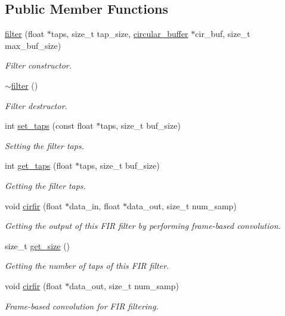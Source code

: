\subsection*{Public Member Functions}
\begin{DoxyCompactItemize}
\item 
\hyperlink{classfilter_a257d61c89ec8558363f6015fdb9016d7}{filter} (float $\ast$taps, size\+\_\+t tap\+\_\+size, \hyperlink{classcircular__buffer}{circular\+\_\+buffer} $\ast$cir\+\_\+buf, size\+\_\+t max\+\_\+buf\+\_\+size)
\begin{DoxyCompactList}\small\item\em Filter constructor. \end{DoxyCompactList}\item 
\mbox{\label{classfilter_a73337fb0e69db82e7c5025e0297ebac5}} 
\hyperlink{classfilter_a73337fb0e69db82e7c5025e0297ebac5}{$\sim$filter} ()
\begin{DoxyCompactList}\small\item\em Filter destructor. \end{DoxyCompactList}\item 
int \hyperlink{classfilter_a2110dd72f12765f0da1c8e3cb4043a67}{set\+\_\+taps} (const float $\ast$taps, size\+\_\+t buf\+\_\+size)
\begin{DoxyCompactList}\small\item\em Setting the filter taps. \end{DoxyCompactList}\item 
int \hyperlink{classfilter_a9ed7fc2a499abfa2aaffc5477e00fb54}{get\+\_\+taps} (float $\ast$taps, size\+\_\+t buf\+\_\+size)
\begin{DoxyCompactList}\small\item\em Getting the filter taps. \end{DoxyCompactList}\item 
void \hyperlink{classfilter_a983d5bb1cda993859f2a31926d2a5988}{cirfir} (float $\ast$data\+\_\+in, float $\ast$data\+\_\+out, size\+\_\+t num\+\_\+samp)
\begin{DoxyCompactList}\small\item\em Getting the output of this F\+IR filter by performing frame-\/based convolution. \end{DoxyCompactList}\item 
size\+\_\+t \hyperlink{classfilter_a1fe57acd364208770931817c847b725a}{get\+\_\+size} ()
\begin{DoxyCompactList}\small\item\em Getting the number of taps of this F\+IR filter. \end{DoxyCompactList}\item 
void \hyperlink{classfilter_a7fba63872346c69a8e48ca634aa195b3}{cirfir} (float $\ast$data\+\_\+out, size\+\_\+t num\+\_\+samp)
\begin{DoxyCompactList}\small\item\em Frame-\/based convolution for F\+IR filtering. \end{DoxyCompactList}\end{DoxyCompactItemize}



